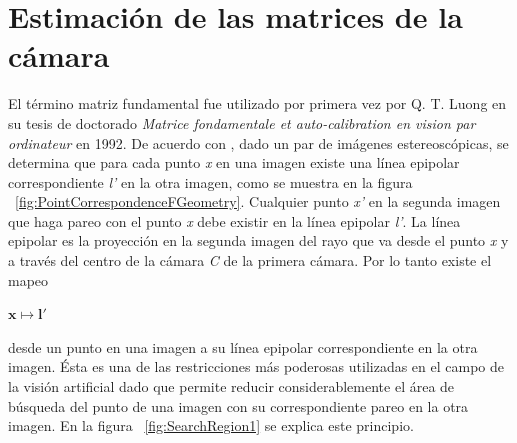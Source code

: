 \section{Estimaci\'{o}n de las matrices de la c\'{a}mara}
El t\'{e}rmino matriz fundamental fue utilizado por primera vez por Q. T. Luong en su tesis de doctorado \textit{Matrice fondamentale et auto-calibration en vision par ordinateur} en 1992. De acuerdo con \cite{Hartley_Zisserman_2003}, dado un par de im\'{a}genes estereosc\'{o}picas, se determina que para cada punto \textit{x} en una imagen existe una l\'{i}nea epipolar correspondiente \textit{l'} en la otra imagen, como se muestra en la figura ~\ref{fig:PointCorrespondenceFGeometry}. Cualquier punto \textit{x'} en la segunda imagen que haga pareo con el punto \textit{x} debe existir en la l\'{i}nea epipolar \textit{l'}. La l\'{i}nea epipolar es la proyecci\'{o}n en la segunda imagen del rayo que va desde el punto \textit{x} y a trav\'{e}s del centro de la c\'{a}mara \textit{C} de la primera c\'{a}mara. Por lo tanto existe el mapeo

\vspace{5 mm}
\begin{center}
$\mathbf{x \mapsto l'}$
\end{center}
\vspace{5 mm}

desde un punto en una imagen a su l\'{i}nea epipolar correspondiente en la otra imagen. \'{E}sta es una de las restricciones m\'{a}s poderosas utilizadas en el campo de la visi\'{o}n artificial dado que permite reducir considerablemente el \'{a}rea de b\'{u}squeda del punto de una imagen con su correspondiente pareo en la otra imagen. En la figura ~\ref{fig:SearchRegion1} se explica este principio.

